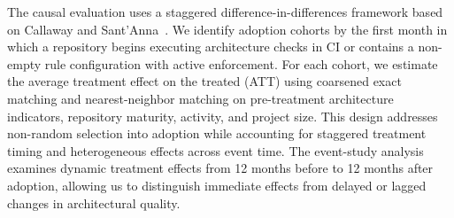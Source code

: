The causal evaluation uses a staggered difference-in-differences framework based on Callaway and Sant'Anna~\cite{callaway2021}. We identify adoption cohorts by the first month in which a repository begins executing architecture checks in CI or contains a non-empty rule configuration with active enforcement. For each cohort, we estimate the average treatment effect on the treated (ATT) using coarsened exact matching and nearest-neighbor matching on pre-treatment architecture indicators, repository maturity, activity, and project size. This design addresses non-random selection into adoption while accounting for staggered treatment timing and heterogeneous effects across event time. The event-study analysis examines dynamic treatment effects from 12 months before to 12 months after adoption, allowing us to distinguish immediate effects from delayed or lagged changes in architectural quality.




